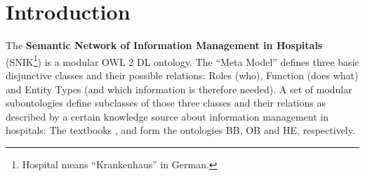 \documentclass[sw]{iosart2x}
\renewcommand{\citet}{\cite}%
\begin{document}
\section{Introduction}\label{sec:introduction}
The \textbf{Semantic Network of Information Management in Hospitals} (SNIK\footnote{Hospital means \enquote{Krankenhaus} in German.}) is a modular OWL 2 DL ontology.
The \enquote{Meta Model} defines three basic disjunctive classes and their possible relations: Roles (who), Function (does what) and Entity Types (and which information is therefore needed).
A set of modular subontologies define subclasses of those three classes and their relations as described by a certain knowledge source about information management in hospitals:
The textbooks \citet{bb}, \citet{ob} and \citet{he} form the ontologies BB, OB and HE, respectively. 
\end{document}
